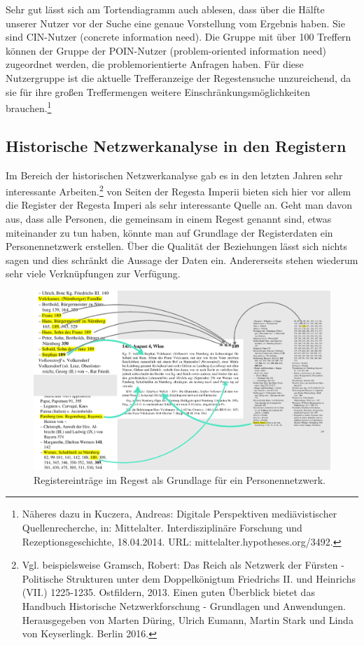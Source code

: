 Sehr gut lässt sich am Tortendiagramm auch ablesen, dass über die Hälfte
unserer Nutzer vor der Suche eine genaue Vorstellung vom Ergebnis haben.
Sie sind CIN-Nutzer (concrete information need). Die Gruppe mit über 100
Treffern können der Gruppe der POIN-Nutzer (problem-oriented information
need) zugeordnet werden, die problemorientierte Anfragen haben. Für
diese Nutzergruppe ist die aktuelle Trefferanzeige der Regestensuche
unzureichend, da sie für ihre großen Treffermengen weitere
Einschränkungsmöglichkeiten brauchen.\footnote{Näheres dazu in Kuczera,
  Andreas: Digitale Perspektiven mediävistischer Quellenrecherche, in:
  Mittelalter. Interdisziplinäre Forschung und Rezeptionsgeschichte,
  18.04.2014. URL: mittelalter.hypotheses.org/3492.}

\hypertarget{historische-netzwerkanalyse-in-den-registern}{%
\subsection{Historische Netzwerkanalyse in den
Registern}\label{historische-netzwerkanalyse-in-den-registern}}

Im Bereich der historischen Netzwerkanalyse gab es in den letzten Jahren
sehr interessante Arbeiten.\footnote{Vgl. beispielsweise Gramsch,
  Robert: Das Reich als Netzwerk der Fürsten - Politische Strukturen
  unter dem Doppelkönigtum Friedrichs II. und Heinrichs (VII.)
  1225-1235. Ostfildern, 2013. Einen guten Überblick bietet das Handbuch
  Historische Netzwerkforschung - Grundlagen und Anwendungen.
  Herausgegeben von Marten Düring, Ulrich Eumann, Martin Stark und Linda
  von Keyserlingk. Berlin 2016.} von Seiten der Regesta Imperii bieten
sich hier vor allem die Register der Regesta Imperi als sehr
interessante Quelle an. Geht man davon aus, dass alle Personen, die
gemeinsam in einem Regest genannt sind, etwas miteinander zu tun haben,
könnte man auf Grundlage der Registerdaten ein Personennetzwerk
erstellen. Über die Qualität der Beziehungen lässt sich nichts sagen und
dies schränkt die Aussage der Daten ein. Andererseits stehen wiederum
sehr viele Verknüpfungen zur Verfügung.

\begin{figure}
\centering
\includegraphics{Bilder/Register-und-Regest-19-189.png}
\caption{Registereinträge im Regest als Grundlage für ein
Personennetzwerk.}
\end{figure}

